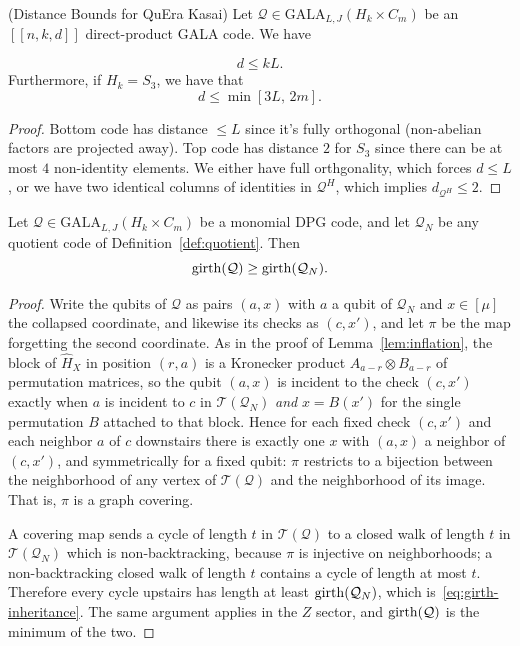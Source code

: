 \begin{corollary}(Distance Bounds for QuEra Kasai)
    Let $\mathcal{Q}\in \mathrm{GALA}_{L,J}(H_k\times C_m)$ be an $[[n,k,d]]$ direct-product GALA code. We have 

    \begin{equation}
        d\leq kL.
    \end{equation}
    Furthermore, if $H_k = S_3$, we have that 
    \begin{equation}
        d\leq \min [3L,\, 2m ].
    \end{equation}
\end{corollary}

\begin{proof}
    Bottom code has distance $\leq L$ since it's fully orthogonal (non-abelian factors are projected away). Top code has distance $2$ for $S_3$ since there can be at most $4$ non-identity elements. We either have full orthgonality, which forces $d\leq L$, or we have two identical columns of identities in $\mathcal{Q}^H$, which implies $d_{\mathcal{Q}^H}\leq 2$.
\end{proof}


\begin{lemma}\label{lem:girth-inheritance}
Let $\mathcal{Q}\in \mathrm{GALA}_{L,J}(H_k\times C_m)$ be a monomial DPG code, and let $\mathcal Q_N$ be any quotient code of Definition~\ref{def:quotient}. Then
\begin{equation}\label{eq:girth-inheritance}
    \mathrm{girth}(\mathcal{Q})\geq \mathrm{girth}(\mathcal{Q}_{N}).
\end{equation}
\end{lemma}

\begin{proof}
Write the qubits of $\mathcal Q$ as pairs $(a,x)$ with $a$ a qubit of $\mathcal Q_N$ and $x\in[\mu]$ the collapsed coordinate, and likewise its checks as $(c,x')$, and let $\pi$ be the map forgetting the second coordinate. As in the proof of Lemma~\ref{lem:inflation}, the block of $\hat H_X$ in position $(r,a)$ is a Kronecker product $A_{a-r}\otimes B_{a-r}$ of permutation matrices, so the qubit $(a,x)$ is incident to the check $(c,x')$ exactly when $a$ is incident to $c$ in $\mathcal T(\mathcal Q_N)$ \emph{and} $x = B(x')$ for the single permutation $B$ attached to that block. Hence for each fixed check $(c,x')$ and each neighbor $a$ of $c$ downstairs there is exactly one $x$ with $(a,x)$ a neighbor of $(c,x')$, and symmetrically for a fixed qubit: $\pi$ restricts to a bijection between the neighborhood of any vertex of $\mathcal T(\mathcal Q)$ and the neighborhood of its image. That is, $\pi$ is a graph covering.

A covering map sends a cycle of length $t$ in $\mathcal T(\mathcal Q)$ to a closed walk of length $t$ in $\mathcal T(\mathcal Q_N)$ which is non-backtracking, because $\pi$ is injective on neighborhoods; a non-backtracking closed walk of length $t$ contains a cycle of length at most $t$. Therefore every cycle upstairs has length at least $\mathrm{girth}(\mathcal Q_N)$, which is~\eqref{eq:girth-inheritance}. The same argument applies in the $Z$ sector, and $\mathrm{girth}(\mathcal Q)$ is the minimum of the two.
\end{proof}

